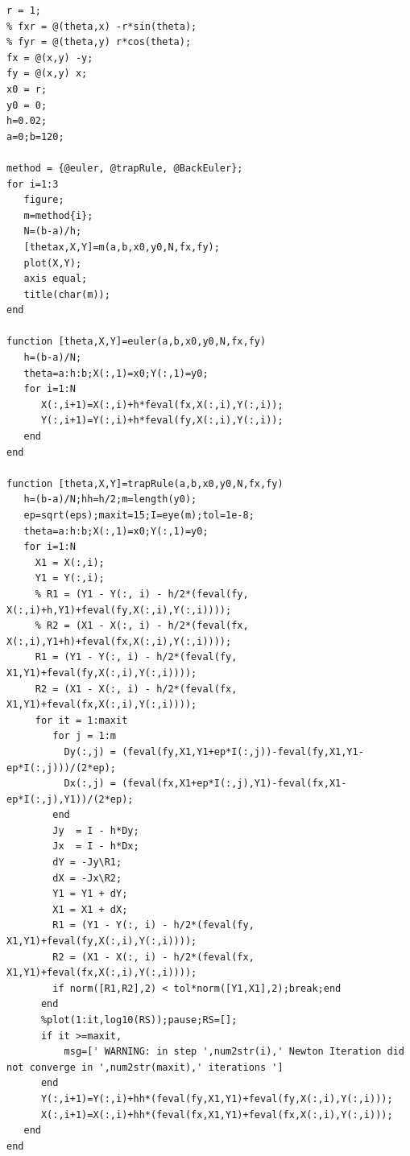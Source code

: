 \documentclass[letterpaper, reqno,11pt]{article}
\begin{document}
\begin{lstlisting}
r = 1;
% fxr = @(theta,x) -r*sin(theta);
% fyr = @(theta,y) r*cos(theta);
fx = @(x,y) -y;
fy = @(x,y) x;
x0 = r;
y0 = 0;
h=0.02;
a=0;b=120;

method = {@euler, @trapRule, @BackEuler};
for i=1:3
   figure;
   m=method{i};
   N=(b-a)/h;
   [thetax,X,Y]=m(a,b,x0,y0,N,fx,fy);
   plot(X,Y);
   axis equal;
   title(char(m));
end

function [theta,X,Y]=euler(a,b,x0,y0,N,fx,fy)
   h=(b-a)/N;
   theta=a:h:b;X(:,1)=x0;Y(:,1)=y0;
   for i=1:N
      X(:,i+1)=X(:,i)+h*feval(fx,X(:,i),Y(:,i));
      Y(:,i+1)=Y(:,i)+h*feval(fy,X(:,i),Y(:,i));
   end
end

function [theta,X,Y]=trapRule(a,b,x0,y0,N,fx,fy)
   h=(b-a)/N;hh=h/2;m=length(y0);
   ep=sqrt(eps);maxit=15;I=eye(m);tol=1e-8;
   theta=a:h:b;X(:,1)=x0;Y(:,1)=y0;
   for i=1:N
     X1 = X(:,i);
     Y1 = Y(:,i);
     % R1 = (Y1 - Y(:, i) - h/2*(feval(fy, X(:,i)+h,Y1)+feval(fy,X(:,i),Y(:,i))));
     % R2 = (X1 - X(:, i) - h/2*(feval(fx, X(:,i),Y1+h)+feval(fx,X(:,i),Y(:,i))));
     R1 = (Y1 - Y(:, i) - h/2*(feval(fy, X1,Y1)+feval(fy,X(:,i),Y(:,i))));
     R2 = (X1 - X(:, i) - h/2*(feval(fx, X1,Y1)+feval(fx,X(:,i),Y(:,i))));
     for it = 1:maxit 
        for j = 1:m
          Dy(:,j) = (feval(fy,X1,Y1+ep*I(:,j))-feval(fy,X1,Y1-ep*I(:,j)))/(2*ep);
          Dx(:,j) = (feval(fx,X1+ep*I(:,j),Y1)-feval(fx,X1-ep*I(:,j),Y1))/(2*ep);
        end
        Jy  = I - h*Dy;
        Jx  = I - h*Dx;
        dY = -Jy\R1;
        dX = -Jx\R2;
        Y1 = Y1 + dY;
        X1 = X1 + dX;
        R1 = (Y1 - Y(:, i) - h/2*(feval(fy, X1,Y1)+feval(fy,X(:,i),Y(:,i))));
        R2 = (X1 - X(:, i) - h/2*(feval(fx, X1,Y1)+feval(fx,X(:,i),Y(:,i))));
        if norm([R1,R2],2) < tol*norm([Y1,X1],2);break;end
      end
      %plot(1:it,log10(RS));pause;RS=[];
      if it >=maxit,
          msg=[' WARNING: in step ',num2str(i),' Newton Iteration did not converge in ',num2str(maxit),' iterations ']
      end
      Y(:,i+1)=Y(:,i)+hh*(feval(fy,X1,Y1)+feval(fy,X(:,i),Y(:,i)));
      X(:,i+1)=X(:,i)+hh*(feval(fx,X1,Y1)+feval(fx,X(:,i),Y(:,i)));
   end
end


\end{lstlisting}
\end{document}
